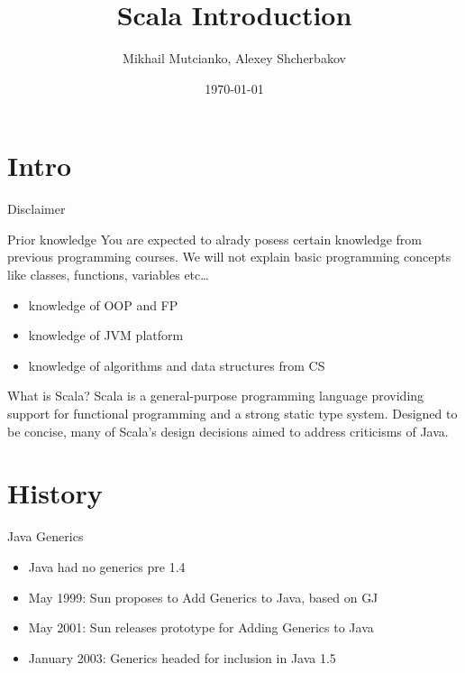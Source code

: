 \documentclass[aspectratio=169]{beamer}
\title{Scala Introduction}
\author{Mikhail Mutcianko, Alexey Shcherbakov}
\institute{СПБгУ, СП}
\date{\today}
\begin{document}
\frame{\titlepage}

\section{Intro}

\begin{frame}{Disclaimer}
  \begin{block}{Prior knowledge}
    You are expected to alrady posess certain knowledge from previous programming courses.
    We will not explain basic programming concepts like classes, functions, variables etc\ldots
  \end{block}
  \pause
  \begin{itemize}
    \item knowledge of OOP and FP
      \pause
    \item knowledge of JVM platform
      \pause
    \item knowledge of algorithms and data structures from CS
  \end{itemize}
\end{frame}

\begin{frame}{What is Scala?}
  Scala is a general-purpose programming language providing support for
  functional programming and a strong static type system. Designed to be concise, many of Scala's
  design decisions aimed to address criticisms of Java.
\end{frame}

\section{History}

\begin{frame}{Java Generics}
  \begin{itemize}
    \item Java had no generics pre 1.4
    \item May 1999: Sun proposes to Add Generics to Java, based on GJ
    \item May 2001: Sun releases prototype for Adding Generics to Java
    \item January 2003: Generics headed for inclusion in Java 1.5
  \end{itemize}
\end{frame}
\end{document}
